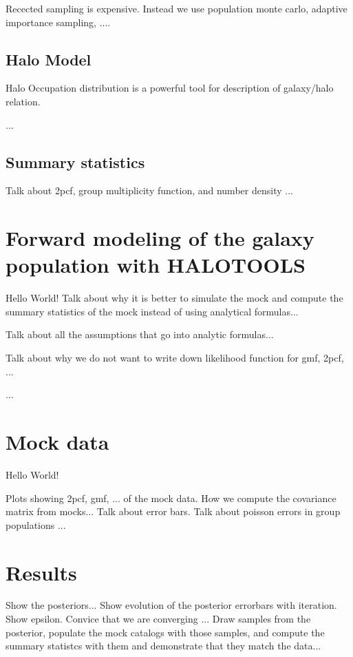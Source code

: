 \documentclass[12pt, preprint]{aastex}
\begin{document}
Recected sampling is expensive. Instead we use population monte carlo, adaptive importance sampling, ....

\subsection{Halo Model}

Halo Occupation distribution is a powerful tool for description of galaxy/halo relation.

...

\subsection{Summary statistics}

Talk about 2pcf, group multiplicity function, and number density ...

\section{Forward modeling of the galaxy population with HALOTOOLS}

Hello World!
Talk about why it is better to simulate the mock and compute the summary statistics of the mock instead of 
using analytical formulas...

Talk about all the assumptions that go into analytic formulas...

Talk about why we do not want to write down likelihood function for gmf, 2pcf, ...

...


\section{Mock data}

Hello World!

Plots showing 2pcf, gmf, ... of the mock data.
How we compute the covariance matrix from mocks...
Talk about error bars. Talk about poisson errors in group populations ...

\section{Results}

Show the posteriors...
Show evolution of the posterior errorbars with iteration. Show epsilon. Convice that we are converging ...
Draw samples from the posterior, populate the mock catalogs with those samples, and compute the summary statistcs with them 
and demonstrate that they match the data...
\end{document}
